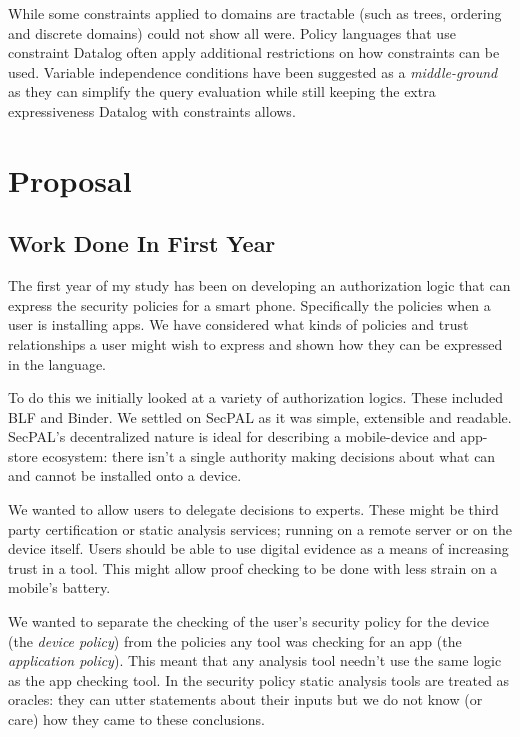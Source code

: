 \documentclass[a4paper,sfsidenotes]{tufte-book}
\begin{document}
While some constraints applied to domains are tractable (such as
trees, ordering and discrete domains) \citeauthor*{Li:2003ix} could not show
all were.  Policy languages that use constraint Datalog often apply
additional restrictions on how constraints can be used.  Variable independence
conditions\cite{Chomicki:2000tz} have been suggested as a \emph{middle-ground}
as they can simplify the query evaluation while still keeping the extra
expressiveness Datalog with constraints allows.


\section{Proposal}

\subsection{Work Done In First Year}

The first year of my study has been on developing an
authorization logic that can express the security policies for
a smart phone. Specifically the policies when a user is installing apps.
We have considered what kinds of policies and trust
relationships a user might wish to express and shown how they can be expressed
in the language.

To do this we initially looked at a variety of authorization logics.  These
included BLF\cite{Whitehead:2004bu} and Binder\cite{DeTreville:2002ff}. We
settled 
on SecPAL as it was simple, extensible and readable.  SecPAL's
decentralized nature is ideal for describing a mobile-device and
app-store ecosystem:  there isn't a single authority making decisions about
what can and cannot be installed onto a device.  

We wanted to allow users to delegate decisions to
experts. These might be third party certification or static analysis
services; running on a remote server or on the device itself.  Users should be
able to use digital evidence\cite{Stark:2009uc} as a means of increasing
trust in a tool. This might allow proof checking to be done with
less strain on a mobile's battery. 

We wanted to separate
the checking of the user's security policy for the device (the
\emph{device policy}) from the policies any tool was checking for an app (the
\emph{application policy}).  This meant that any analysis tool needn't use the
same logic as the app checking tool.  In the security policy static analysis tools are treated as
oracles: they can utter statements about their inputs but we do not know (or
care) how they came to these conclusions.
\end{document}
